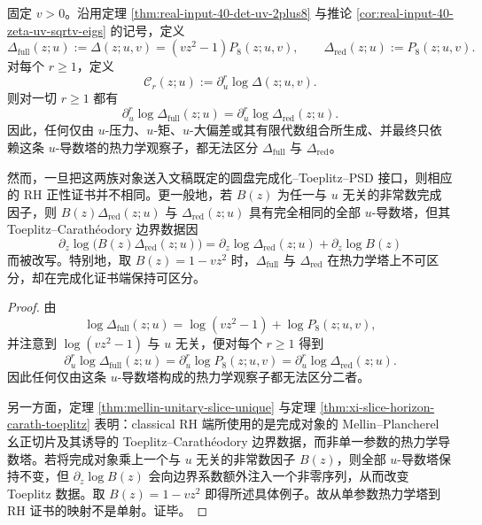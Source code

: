 \begin{theorem}\label{thm:xi-time-part62ae-oneparam-thermodynamic-tower-rh-indistinguishability}
固定 \(v>0\)。沿用定理 \ref{thm:real-input-40-det-uv-2plus8} 与推论 \ref{cor:real-input-40-zeta-uv-sqrtv-eigs} 的记号，定义
\[
\Delta_{\mathrm{full}}(z;u)
:=
\Delta(z;u,v)
=(vz^2-1)P_8(z;u,v),
\qquad
\Delta_{\mathrm{red}}(z;u):=P_8(z;u,v).
\]
对每个 \(r\ge 1\)，定义
\[
\mathcal C_r(z;u):=\partial_u^r\log\Delta(z;u,v).
\]
则对一切 \(r\ge 1\) 都有
\[
\partial_u^r\log \Delta_{\mathrm{full}}(z;u)
=
\partial_u^r\log \Delta_{\mathrm{red}}(z;u).
\]
因此，任何仅由 \(u\)-压力、\(u\)-矩、\(u\)-大偏差或其有限代数组合所生成、并最终只依赖这条 \(u\)-导数塔的热力学观察子，都无法区分 \(\Delta_{\mathrm{full}}\) 与 \(\Delta_{\mathrm{red}}\)。

然而，一旦把这两族对象送入文稿既定的圆盘完成化--Toeplitz--PSD 接口，则相应的 RH 正性证书并不相同。更一般地，若 \(B(z)\) 为任一与 \(u\) 无关的非常数完成因子，则 \(B(z)\Delta_{\mathrm{red}}(z;u)\) 与 \(\Delta_{\mathrm{red}}(z;u)\) 具有完全相同的全部 \(u\)-导数塔，但其 Toeplitz--Carath\'eodory 边界数据因
\[
\partial_z\log\!\bigl(B(z)\Delta_{\mathrm{red}}(z;u)\bigr)
=
\partial_z\log \Delta_{\mathrm{red}}(z;u)+\partial_z\log B(z)
\]
而被改写。特别地，取 \(B(z)=1-vz^2\) 时，\(\Delta_{\mathrm{full}}\) 与 \(\Delta_{\mathrm{red}}\) 在热力学塔上不可区分，却在完成化证书端保持可区分。
\end{theorem}
\begin{proof}
由
\[
\log\Delta_{\mathrm{full}}(z;u)
=
\log(vz^2-1)+\log P_8(z;u,v),
\]
并注意到 \(\log(vz^2-1)\) 与 \(u\) 无关，便对每个 \(r\ge 1\) 得到
\[
\partial_u^r\log\Delta_{\mathrm{full}}(z;u)
=
\partial_u^r\log P_8(z;u,v)
=
\partial_u^r\log\Delta_{\mathrm{red}}(z;u).
\]
因此任何仅由这条 \(u\)-导数塔构成的热力学观察子都无法区分二者。

另一方面，定理 \ref{thm:mellin-unitary-slice-unique} 与定理 \ref{thm:xi-slice-horizon-carath-toeplitz} 表明：classical RH 端所使用的是完成对象的 Mellin--Plancherel 幺正切片及其诱导的 Toeplitz--Carath\'eodory 边界数据，而非单一参数的热力学导数塔。若将完成对象乘上一个与 \(u\) 无关的非常数因子 \(B(z)\)，则全部 \(u\)-导数塔保持不变，但 \(\partial_z\log B(z)\) 会向边界系数额外注入一个非零序列，从而改变 Toeplitz 数据。取 \(B(z)=1-vz^2\) 即得所述具体例子。故从单参数热力学塔到 RH 证书的映射不是单射。证毕。
\end{proof}

